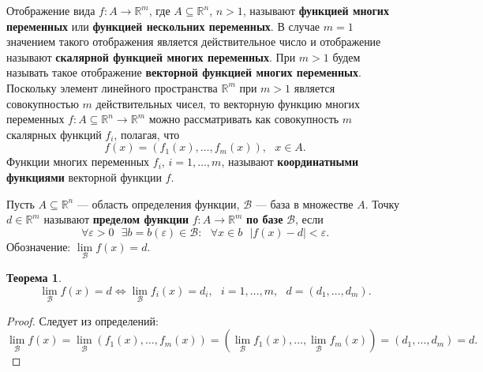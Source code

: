 \documentclass[12pt]{report}
\numberwithin{equation}{section}
\newtheorem{theorem}{Теорема}[section]
\begin{document}

Отображение вида $f : A \to \mathbb{R}^m$, где $A \subseteq \mathbb{R}^n$, $n > 1$, называют \textbf{функцией многих переменных} или \textbf{функцией нескольних переменных}. В случае $m = 1$ значением такого отображения является действительное число и отображение называют \textbf{скалярной функцией многих переменных}. При $m > 1$ будем называть такое отображение \textbf{векторной функцией многих переменных}.\\

Поскольку элемент линейного пространства $\mathbb{R}^m$ при $m > 1$ является совокупностью $m$ действительных чисел, то векторную функцию многих переменных $f : A \subseteq \mathbb{R}^n \to \mathbb{R}^m$ можно рассматривать как совокупность $m$ скалярных функций $f_i$, полагая, что
\begin{equation} \label{eq:32:1}
f(x) = (f_1(x), \ldots, f_m(x)),~~~ x \in A.
\end{equation}
Функции многих переменных $f_i$, $i = 1, \ldots, m$, называют \textbf{координатными функциями} векторной функции $f$.

Пусть $A \subseteq \mathbb{R}^n$ --- область определения функции, $\mathcal{B}$ --- база в множестве $A$. Точку $d \in \mathbb{R}^m$ называют \textbf{пределом функции} $f : A \to \mathbb{R}^m$ \textbf{по базе} $\mathcal{B}$, если
\[ \forall \varepsilon > 0~~~\exists b = b(\varepsilon) \in \mathcal{B}:~~~ \forall x \in b ~~~ |f(x) - d| < \varepsilon. \]
Обозначение: $\lim\limits_{\mathcal{B}}f(x) = d$.

\begin{theorem} \label{th:32:1}
\[ \lim_{\mathcal{B}}f(x) = d \iff \lim_{\mathcal{B}}f_i(x) = d_i,~~~i = 1, \ldots, m, ~~~ d = (d_1, \ldots, d_m).\]
\end{theorem}
\begin{proof}
Следует из определений:
\[ \lim_{\mathcal{B}}f(x) = \lim_{\mathcal{B}}(f_1(x), \ldots, f_m(x)) = (\lim_{\mathcal{B}}f_1(x), \ldots, \lim_{\mathcal{B}}f_m(x)) = (d_1, \ldots, d_m) = d.\]
\end{proof}
\end{document}
